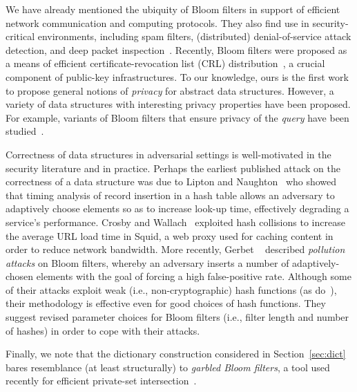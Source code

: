 We have already mentioned the ubiquity of Bloom filters in support of efficient
network communication and computing protocols.  They also find use in
security-critical environments, including spam filters, (distributed)
denial-of-service attack detection, and deep packet
inspection~\cite{tarkoma2012theory}.  Recently, Bloom filters were proposed as a
means of efficient certificate-revocation list (CRL)
distribution~\cite{larisch2017crlite}, a crucial component of public-key
infrastructures.  To our knowledge, ours is the first work to propose general
notions of \emph{privacy} for abstract data structures.  However, a variety of
data structures with interesting privacy properties have been proposed.  For
example, variants of Bloom filters that ensure privacy of the \emph{query} have
been studied~\cite{bellovin2004privacy,nojima2009cryptographically}.
%

Correctness of data structures in adversarial settings is well-motivated in the
security literature and in practice.
%
Perhaps the earliest published attack on the correctness of a data structure was due to
Lipton and Naughton~\cite{lipton1993clocked} who showed that timing analysis of
record insertion in a hash table allows an adversary to adaptively choose
elements so as to increase look-up time, effectively degrading a service's
performance.
%
Crosby and Wallach~\cite{crosby2003denial} exploited hash collisions to increase
the average URL load time in Squid, a web proxy used for caching content in
order to reduce network bandwidth.
%
More recently, Gerbet \etal~\cite{gerbet2015power} described \emph{pollution
attacks} on Bloom filters, whereby an adversary inserts a number of
adaptively-chosen elements with the goal of forcing a high false-positive rate.
Although some of their attacks exploit weak (i.e., non-cryptographic) hash
functions (as do~\cite{crosby2003denial}), their methodology is effective even
for good choices of hash functions.
%
They suggest revised parameter choices for Bloom filters (i.e., filter length and
number of hashes) in order to cope with their attacks.


Finally, we note that the dictionary construction considered in
Section~\ref{sec:dict} bares resemblance (at least structurally) to
\emph{garbled Bloom filters}, a tool used recently for efficient private-set
intersection~\cite{dong2013when,rindal2017improved}.

